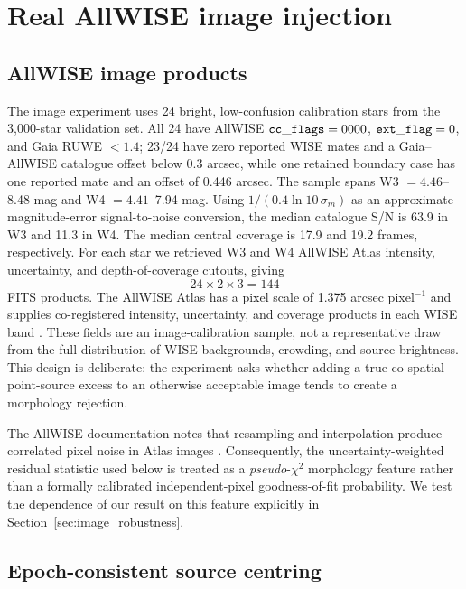 \documentclass[fleqn,usenatbib]{mnras}
\begin{document}
\section{Real AllWISE image injection}
\label{sec:image}

\subsection{AllWISE image products}

The image experiment uses 24 bright, low-confusion calibration stars from the 3,000-star validation set. All 24 have AllWISE ${\tt cc\_flags}=0000$, ${\tt ext\_flag}=0$, and Gaia RUWE $<1.4$; 23/24 have zero reported WISE mates and a Gaia--AllWISE catalogue offset below 0.3 arcsec, while one retained boundary case has one reported mate and an offset of 0.446 arcsec. The sample spans W3 $=4.46$--8.48 mag and W4 $=4.41$--7.94 mag. Using $1/(0.4\ln10\,\sigma_m)$ as an approximate magnitude-error signal-to-noise conversion, the median catalogue S/N is 63.9 in W3 and 11.3 in W4. The median central coverage is 17.9 and 19.2 frames, respectively. For each star we retrieved W3 and W4 AllWISE Atlas intensity, uncertainty, and depth-of-coverage cutouts, giving
\begin{equation}
24\times2\times3=144
\end{equation}
FITS products. The AllWISE Atlas has a pixel scale of 1.375 arcsec pixel$^{-1}$ and supplies co-registered intensity, uncertainty, and coverage products in each WISE band \citep{Cutri2013}. These fields are an image-calibration sample, not a representative draw from the full distribution of WISE backgrounds, crowding, and source brightness. This design is deliberate: the experiment asks whether adding a true co-spatial point-source excess to an otherwise acceptable image tends to create a morphology rejection.

The AllWISE documentation notes that resampling and interpolation produce correlated pixel noise in Atlas images \citep{Cutri2013}. Consequently, the uncertainty-weighted residual statistic used below is treated as a \emph{pseudo}-$\chi^2$ morphology feature rather than a formally calibrated independent-pixel goodness-of-fit probability. We test the dependence of our result on this feature explicitly in Section~\ref{sec:image_robustness}.

\subsection{Epoch-consistent source centring}
\end{document}
